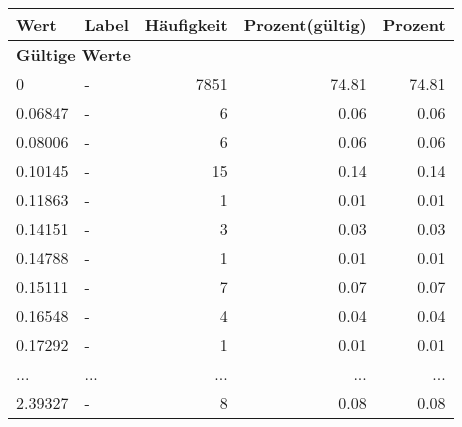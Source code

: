      \begin{longtable}{lXrrr}
     \toprule
     \textbf{Wert} & \textbf{Label} & \textbf{Häufigkeit} & \textbf{Prozent(gültig)} & \textbf{Prozent} \\
     \endhead
     \midrule
     \multicolumn{5}{l}{\textbf{Gültige Werte}}\\
        0 & \multicolumn{1}{X}{-} & %
          \num{7851} &
          \num[round-mode=places,round-precision=2]{74,81} &
          \num[round-mode=places,round-precision=2]{74,81} \\
        0.06847 & \multicolumn{1}{X}{-} & %
          \num{6} &
          \num[round-mode=places,round-precision=2]{0,06} &
          \num[round-mode=places,round-precision=2]{0,06} \\
        0.08006 & \multicolumn{1}{X}{-} & %
          \num{6} &
          \num[round-mode=places,round-precision=2]{0,06} &
          \num[round-mode=places,round-precision=2]{0,06} \\
        0.10145 & \multicolumn{1}{X}{-} & %
          \num{15} &
          \num[round-mode=places,round-precision=2]{0,14} &
          \num[round-mode=places,round-precision=2]{0,14} \\
        0.11863 & \multicolumn{1}{X}{-} & %
          \num{1} &
          \num[round-mode=places,round-precision=2]{0,01} &
          \num[round-mode=places,round-precision=2]{0,01} \\
        0.14151 & \multicolumn{1}{X}{-} & %
          \num{3} &
          \num[round-mode=places,round-precision=2]{0,03} &
          \num[round-mode=places,round-precision=2]{0,03} \\
        0.14788 & \multicolumn{1}{X}{-} & %
          \num{1} &
          \num[round-mode=places,round-precision=2]{0,01} &
          \num[round-mode=places,round-precision=2]{0,01} \\
        0.15111 & \multicolumn{1}{X}{-} & %
          \num{7} &
          \num[round-mode=places,round-precision=2]{0,07} &
          \num[round-mode=places,round-precision=2]{0,07} \\
        0.16548 & \multicolumn{1}{X}{-} & %
          \num{4} &
          \num[round-mode=places,round-precision=2]{0,04} &
          \num[round-mode=places,round-precision=2]{0,04} \\
        0.17292 & \multicolumn{1}{X}{-} & %
          \num{1} &
          \num[round-mode=places,round-precision=2]{0,01} &
          \num[round-mode=places,round-precision=2]{0,01} \\
       ... & ... & ... & ... & ... \\
        2.39327 & \multicolumn{1}{X}{-} & %
          \num{8} &
          \num[round-mode=places,round-precision=2]{0,08} &
          \num[round-mode=places,round-precision=2]{0,08} \\


\end{longtable}
